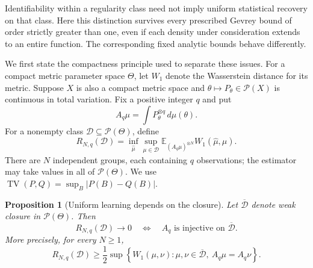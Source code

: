 \documentclass[11pt,letterpaper]{article}
\newtheorem{proposition}[theorem]{Proposition}
\theoremstyle{definition}
\theoremstyle{remark}
\newcommand{\1}{\mathbf 1}
\begin{document}
Identifiability within a regularity class need not imply uniform
statistical recovery on that class.  Here this distinction survives
every prescribed Gevrey bound of order strictly greater than one,
even if each density under consideration extends to an entire function.
The corresponding fixed analytic bounds behave differently.

We first state the compactness principle used to separate these issues.
For a compact metric parameter space $\Theta$, let $W_1$ denote the
Wasserstein distance for its metric.  Suppose $X$ is also a compact
metric space and $\theta\mapsto P_\theta\in\mathcal P(X)$ is continuous
in total variation.  Fix a positive integer $q$ and put
\[
 A_q\mu=\int P_\theta^{\otimes q}\,d\mu(\theta).
\]
For a nonempty class $\mathcal D\subseteq\mathcal P(\Theta)$, define
\begin{equation}\label{p11:eq:class-minimax-risk}
 R_{N,q}(\mathcal D)=\inf_{\widehat\mu}
       \sup_{\mu\in\mathcal D}
       \mathbb E_{(A_q\mu)^{\otimes N}}
                    W_1(\widehat\mu,\mu).
\end{equation}
There are $N$ independent groups, each containing $q$ observations;
the estimator may take values in all of $\mathcal P(\Theta)$.
We use $\operatorname{TV}(P,Q)=\sup_B|P(B)-Q(B)|$.

\begin{proposition}[Uniform learning depends on the closure]
\label{p11:prop:closure-learning}
Let $\overline{\mathcal D}$ denote weak closure in
$\mathcal P(\Theta)$.  Then
\begin{equation}\label{p11:eq:closure-criterion}
 R_{N,q}(\mathcal D)\longrightarrow0
 \quad\Longleftrightarrow\quad
 A_q\text{ is injective on }\overline{\mathcal D}.
\end{equation}
More precisely, for every $N\geq1$,
\begin{equation}\label{p11:eq:closure-fiber-lower-bound}
 R_{N,q}(\mathcal D)\geq\frac12
 \sup\left\{W_1(\mu,\nu):
     \mu,\nu\in\overline{\mathcal D},\ A_q\mu=A_q\nu\right\}.
\end{equation}
\end{proposition}
\end{document}
